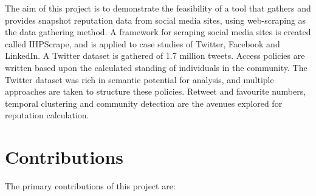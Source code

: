 
The aim of this project is to demonstrate the feasibility of a tool that gathers and provides snapshot reputation data from social media sites, using web-scraping as the data gathering method. A framework for scraping social media sites is created called IHPScrape, and is applied to case studies of Twitter, Facebook and LinkedIn. A Twitter dataset is gathered of 1.7 million tweets. Access policies are written based upon the calculated standing of individuals in the community. The Twitter dataset was rich in semantic potential for analysis, and multiple approaches are taken to structure these policies. Retweet and favourite numbers, temporal clustering and community detection are the avenues explored for reputation calculation. 




\section{Contributions}
The primary contributions of this project are:

